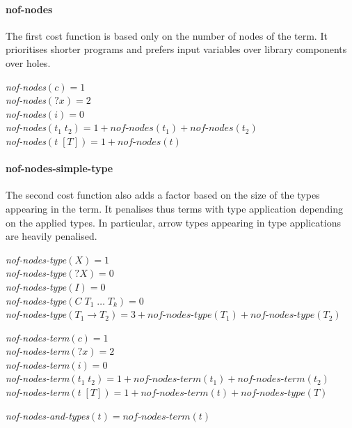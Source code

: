   \paragraph{nof-nodes}
The first cost function is based only on the number of nodes of the term. It prioritises shorter programs and prefers input variables over library components over holes.
%
\begin{algorithm*}

\textit{nof-nodes}$(c) = 1$\\
\textit{nof-nodes}$({?x}) = 2$\\
\textit{nof-nodes}$(i) = 0$\\
\textit{nof-nodes}$(t_1\; t_2) = 1 + \textit{nof-nodes}(t_1) + \textit{nof-nodes}(t_2)$\\
\textit{nof-nodes}$(t\; [T]) = 1 + \textit{nof-nodes}(t)$\\

\end{algorithm*} 
%
  \paragraph{nof-nodes-simple-type}
The second cost function also adds a factor based on the size of the types appearing in the term. It penalises thus terms with type application depending on the applied types. In particular, arrow types appearing in type applications are heavily penalised.
%
\begin{algorithm*}

\textit{nof-nodes-type}$(X) = 1$\\
\textit{nof-nodes-type}$({?X}) = 0$\\
\textit{nof-nodes-type}$(I) = 0$\\
\textit{nof-nodes-type}$(C\; T_1\; \ldots\; T_k) = 0$\\
\textit{nof-nodes-type}$(T_1 \rightarrow T_2) = 3 + \textit{nof-nodes-type}(T_1) + \textit{nof-nodes-type}(T_2)$\\

\BlankLine

\textit{nof-nodes-term}$(c) = 1$\\
\textit{nof-nodes-term}$({?x}) = 2$\\
\textit{nof-nodes-term}$(i) = 0$\\
\textit{nof-nodes-term}$(t_1\; t_2) = 1 + \textit{nof-nodes-term}(t_1) + \textit{nof-nodes-term}(t_2)$\\
\textit{nof-nodes-term}$(t\; [T]) = 1 + \textit{nof-nodes-term}(t) + \textit{nof-nodes-type}(T)$\\

\BlankLine

\textit{nof-nodes-and-types}$(t) = \textit{nof-nodes-term}(t)$
\end{algorithm*} 
%

